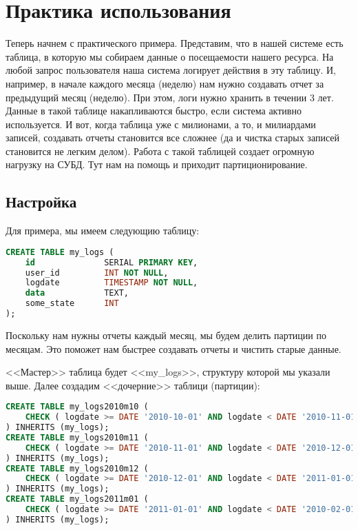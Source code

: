 \section{Практика использования}
Теперь начнем с практического примера. Представим, что в нашей системе есть таблица, в которую мы собираем данные о 
посещаемости нашего ресурса. На любой запрос пользователя наша система логирует действия в эту таблицу. 
И, например, в начале каждого месяца (неделю) нам нужно создавать отчет за предыдущий месяц (неделю). При этом, 
логи нужно хранить в течении 3 лет.
Данные в такой таблице накапливаются быстро, если система активно используется. И вот, когда таблица уже с милионами, а то, 
и милиардами записей, создавать отчеты становится все сложнее (да и чистка старых записей становится не легким делом). 
Работа с такой таблицей создает огромную нагрузку на СУБД. 
Тут нам на помощь и приходит партиционирование.

\subsection{Настройка}
Для примера, мы имеем следующию таблицу:
\begin{lstlisting}[language=SQL,label=lst:partitioning2,caption=<<Мастер>> таблица]
CREATE TABLE my_logs (
    id              SERIAL PRIMARY KEY,
    user_id         INT NOT NULL,
    logdate         TIMESTAMP NOT NULL,
    data            TEXT,
    some_state      INT
);
\end{lstlisting}

Поскольку нам нужны отчеты каждый месяц, мы будем делить партиции по месяцам. Это поможет нам быстрее создавать 
отчеты и чистить старые данные. 

<<Мастер>> таблица будет <<my\_logs>>, структуру которой мы указали выше. Далее создадим <<дочерние>> таблици (партиции):
\begin{lstlisting}[language=SQL,label=lst:partitioning3,caption=<<Дочерние>> таблици]
CREATE TABLE my_logs2010m10 (
    CHECK ( logdate >= DATE '2010-10-01' AND logdate < DATE '2010-11-01' )
) INHERITS (my_logs);
CREATE TABLE my_logs2010m11 (
    CHECK ( logdate >= DATE '2010-11-01' AND logdate < DATE '2010-12-01' )
) INHERITS (my_logs);
CREATE TABLE my_logs2010m12 (
    CHECK ( logdate >= DATE '2010-12-01' AND logdate < DATE '2011-01-01' )
) INHERITS (my_logs);
CREATE TABLE my_logs2011m01 (
    CHECK ( logdate >= DATE '2011-01-01' AND logdate < DATE '2010-02-01' )
) INHERITS (my_logs);
\end{lstlisting}

